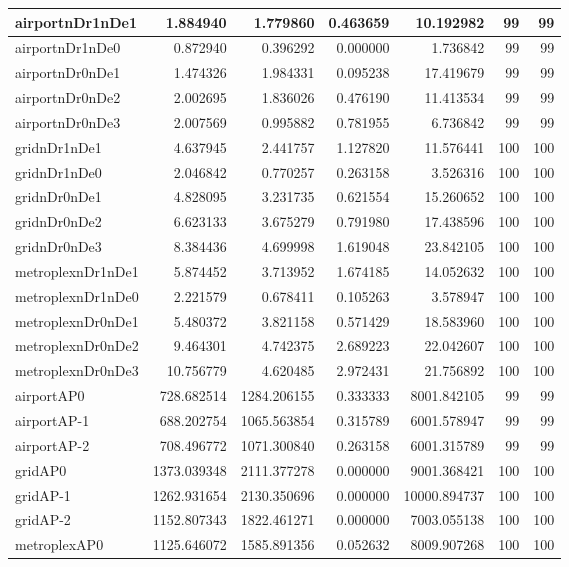 \begin{longtable}{|l|r|r|r|r|r|r|}
\endlastfoot
airportnDr1nDe1 & 1.884940 & 1.779860 & 0.463659 & 10.192982 & 99 & 99 \\ \hline
airportnDr1nDe0 & 0.872940 & 0.396292 & 0.000000 & 1.736842 & 99 & 99 \\ \hline
airportnDr0nDe1 & 1.474326 & 1.984331 & 0.095238 & 17.419679 & 99 & 99 \\ \hline
airportnDr0nDe2 & 2.002695 & 1.836026 & 0.476190 & 11.413534 & 99 & 99 \\ \hline
airportnDr0nDe3 & 2.007569 & 0.995882 & 0.781955 & 6.736842 & 99 & 99 \\ \hline
gridnDr1nDe1 & 4.637945 & 2.441757 & 1.127820 & 11.576441 & 100 & 100 \\ \hline
gridnDr1nDe0 & 2.046842 & 0.770257 & 0.263158 & 3.526316 & 100 & 100 \\ \hline
gridnDr0nDe1 & 4.828095 & 3.231735 & 0.621554 & 15.260652 & 100 & 100 \\ \hline
gridnDr0nDe2 & 6.623133 & 3.675279 & 0.791980 & 17.438596 & 100 & 100 \\ \hline
gridnDr0nDe3 & 8.384436 & 4.699998 & 1.619048 & 23.842105 & 100 & 100 \\ \hline
metroplexnDr1nDe1 & 5.874452 & 3.713952 & 1.674185 & 14.052632 & 100 & 100 \\ \hline
metroplexnDr1nDe0 & 2.221579 & 0.678411 & 0.105263 & 3.578947 & 100 & 100 \\ \hline
metroplexnDr0nDe1 & 5.480372 & 3.821158 & 0.571429 & 18.583960 & 100 & 100 \\ \hline
metroplexnDr0nDe2 & 9.464301 & 4.742375 & 2.689223 & 22.042607 & 100 & 100 \\ \hline
metroplexnDr0nDe3 & 10.756779 & 4.620485 & 2.972431 & 21.756892 & 100 & 100 \\ \hline
airportAP0 & 728.682514 & 1284.206155 & 0.333333 & 8001.842105 & 99 & 99 \\ \hline
airportAP-1 & 688.202754 & 1065.563854 & 0.315789 & 6001.578947 & 99 & 99 \\ \hline
airportAP-2 & 708.496772 & 1071.300840 & 0.263158 & 6001.315789 & 99 & 99 \\ \hline
gridAP0 & 1373.039348 & 2111.377278 & 0.000000 & 9001.368421 & 100 & 100 \\ \hline
gridAP-1 & 1262.931654 & 2130.350696 & 0.000000 & 10000.894737 & 100 & 100 \\ \hline
gridAP-2 & 1152.807343 & 1822.461271 & 0.000000 & 7003.055138 & 100 & 100 \\ \hline
metroplexAP0 & 1125.646072 & 1585.891356 & 0.052632 & 8009.907268 & 100 & 100 \\ \hline

\end{longtable}
